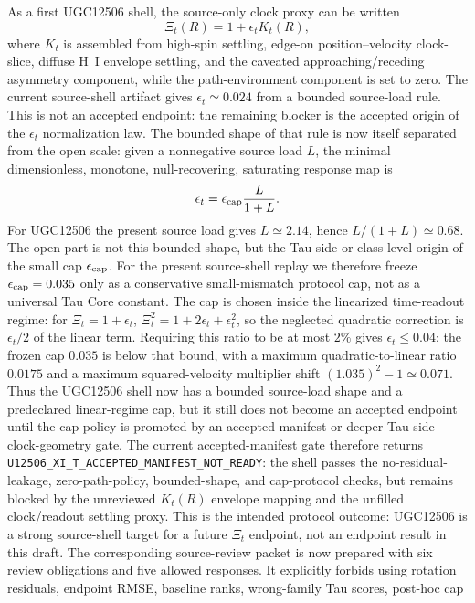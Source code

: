 \documentclass[11pt]{article}
\begin{document}
As a first UGC12506 shell, the source-only clock proxy can be written
\[
  \Xi_t(R)=1+\epsilon_t K_t(R),
\]
where \(K_t\) is assembled from high-spin settling, edge-on
position--velocity clock-slice, diffuse H~I envelope settling, and the
caveated approaching/receding asymmetry component, while the path-environment
component is set to zero.  The current source-shell artifact gives
\(\epsilon_t\simeq0.024\) from a bounded source-load rule.  This is not an
accepted endpoint: the remaining blocker is the accepted origin of the
\(\epsilon_t\) normalization law.
The bounded shape of that rule is now itself separated from the open scale:
given a nonnegative source load \(L\), the minimal dimensionless, monotone,
null-recovering, saturating response map is
\[
  \epsilon_t=\epsilon_{\rm cap}\frac{L}{1+L}.
\]
For UGC12506 the present source load gives \(L\simeq2.14\), hence
\(L/(1+L)\simeq0.68\).  The open part is not this bounded shape, but the
Tau-side or class-level origin of the small cap \(\epsilon_{\rm cap}\).
For the present source-shell replay we therefore freeze
\(\epsilon_{\rm cap}=0.035\) only as a conservative small-mismatch protocol
cap, not as a universal Tau Core constant.  The cap is chosen inside the
linearized time-readout regime: for \(\Xi_t=1+\epsilon_t\),
\(\Xi_t^2=1+2\epsilon_t+\epsilon_t^2\), so the neglected quadratic correction is
\(\epsilon_t/2\) of the linear term.  Requiring this ratio to be at most \(2\%\)
gives \(\epsilon_t\leq0.04\); the frozen cap \(0.035\) is below that bound, with
a maximum quadratic-to-linear ratio \(0.0175\) and a maximum squared-velocity
multiplier shift \((1.035)^2-1\simeq0.071\).  Thus the UGC12506 shell now has a
bounded source-load shape and a predeclared linear-regime cap, but it still does
not become an accepted endpoint until the cap policy is promoted by an
accepted-manifest or deeper Tau-side clock-geometry gate.
The current accepted-manifest gate therefore returns
\texttt{U12506\_XI\_T\_ACCEPTED\_MANIFEST\_NOT\_READY}: the shell passes the
no-residual-leakage, zero-path-policy, bounded-shape, and cap-protocol checks,
but remains blocked by the unreviewed \(K_t(R)\) envelope mapping and the
unfilled clock/readout settling proxy.  This is the intended protocol outcome:
UGC12506 is a strong source-shell target for a future \(\Xi_t\) endpoint, not an
endpoint result in this draft.
The corresponding source-review packet is now prepared with six review
obligations and five allowed responses.  It explicitly forbids using rotation
residuals, endpoint RMSE, baseline ranks, wrong-family Tau scores, post-hoc cap
\end{document}
